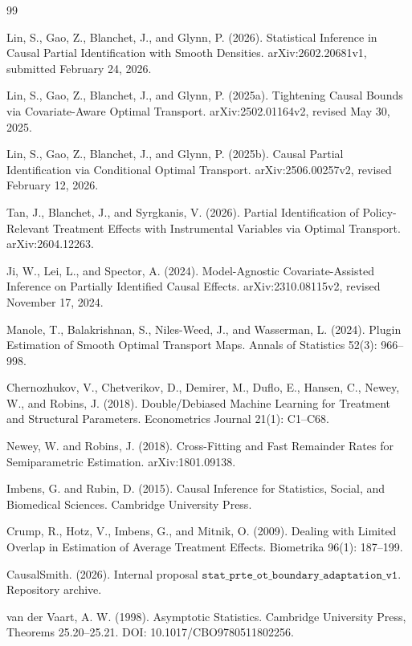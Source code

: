 \documentclass{article}
\begin{document}
\begin{thebibliography}{99}

   Lin, S., Gao, Z., Blanchet, J., and Glynn, P. (2026). Statistical Inference in Causal Partial Identification with Smooth Densities. arXiv:2602.20681v1, submitted February 24, 2026.

   Lin, S., Gao, Z., Blanchet, J., and Glynn, P. (2025a). Tightening Causal Bounds via Covariate-Aware Optimal Transport. arXiv:2502.01164v2, revised May 30, 2025.

   Lin, S., Gao, Z., Blanchet, J., and Glynn, P. (2025b). Causal Partial Identification via Conditional Optimal Transport. arXiv:2506.00257v2, revised February 12, 2026.

   Tan, J., Blanchet, J., and Syrgkanis, V. (2026). Partial Identification of Policy-Relevant Treatment Effects with Instrumental Variables via Optimal Transport. arXiv:2604.12263.

   Ji, W., Lei, L., and Spector, A. (2024). Model-Agnostic Covariate-Assisted Inference on Partially Identified Causal Effects. arXiv:2310.08115v2, revised November 17, 2024.

   Manole, T., Balakrishnan, S., Niles-Weed, J., and Wasserman, L. (2024). Plugin Estimation of Smooth Optimal Transport Maps. Annals of Statistics 52(3): 966--998.

   Chernozhukov, V., Chetverikov, D., Demirer, M., Duflo, E., Hansen, C., Newey, W., and Robins, J. (2018). Double/Debiased Machine Learning for Treatment and Structural Parameters. Econometrics Journal 21(1): C1--C68.

   Newey, W. and Robins, J. (2018). Cross-Fitting and Fast Remainder Rates for Semiparametric Estimation. arXiv:1801.09138.

   Imbens, G. and Rubin, D. (2015). Causal Inference for Statistics, Social, and Biomedical Sciences. Cambridge University Press.

   Crump, R., Hotz, V., Imbens, G., and Mitnik, O. (2009). Dealing with Limited Overlap in Estimation of Average Treatment Effects. Biometrika 96(1): 187--199.

   CausalSmith. (2026). Internal proposal \(\texttt{stat\_prte\_ot\_boundary\_adaptation\_v1}\). Repository archive.

   van der Vaart, A. W. (1998). Asymptotic Statistics. Cambridge University Press, Theorems 25.20--25.21. DOI: 10.1017/CBO9780511802256.

\end{thebibliography}
\end{document}
